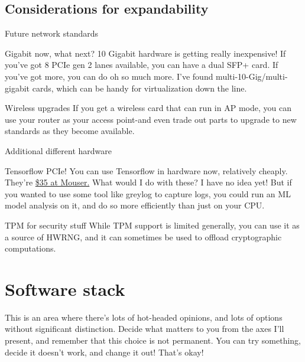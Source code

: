 \documentclass[bigger]{beamer}
\begin{document}
\subsection{Considerations for expandability}
\label{sec:org0ee9e3f}

\begin{frame}[label={sec:org2c89497}]{Future network standards}
\begin{block}{Gigabit now, what next?}
10 Gigabit hardware is getting really inexpensive! If you've got 8 PCIe gen 2
lanes available, you can have a dual SFP+ card. If you've got more, you can do
oh so much more. I've found multi-10-Gig/multi-gigabit cards, which can be handy
for virtualization down the line.
\end{block}

\begin{block}{Wireless upgrades}
If you get a wireless card that can run in AP mode, you can use your router as
your access point-and even trade out parts to upgrade to new standards as they
become available.
\end{block}
\end{frame}

\begin{frame}[label={sec:orgfcacbf9}]{Additional different hardware}
\begin{block}{Tensorflow PCIe!}
You can use Tensorflow in hardware now, relatively cheaply. They're \href{https://www.mouser.com/ProductDetail/Coral/G650-04527-01?qs=sGAEpiMZZMsG1k5vdNM\%252Fcyg9iDc\%25252Bz9JYkOSrS1TKoVU\%253D}{\$35 at
Mouser.} What would I do with these? I have no idea yet! But if you wanted to use
some tool like greylog to capture logs, you could run an ML model analysis on
it, and do so more efficiently than just on your CPU.
\end{block}

\begin{block}{TPM for security stuff}
While TPM support is limited generally, you can use it as a source of HWRNG, and
it can sometimes be used to offload cryptographic computations.
\end{block}
\end{frame}

\section{Software stack}
\label{sec:org2fd137a}
This is an area where there's lots of hot-headed opinions, and lots of options
without significant distinction. Decide what matters to you from the axes I'll
present, and remember that this choice is not permanent. You can try something,
decide it doesn't work, and change it out! That's okay!
\end{document}
